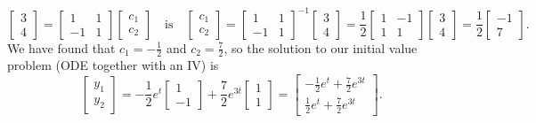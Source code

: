 \begin{example}
$$\begin{bmatrix}3\\4\end{bmatrix} 
=
\begin{bmatrix}1 &1\\-1&1\end{bmatrix}
\begin{bmatrix}c_1\\c_2\end{bmatrix}
 \quad\text{is}\quad 
\begin{bmatrix}c_1\\c_2\end{bmatrix} 
=
\begin{bmatrix}1 &1\\-1&1\end{bmatrix}^{-1}
\begin{bmatrix}3\\4\end{bmatrix} 
=
\frac{1}{2}
\begin{bmatrix}1 &-1\\1&1\end{bmatrix}
\begin{bmatrix}3\\4\end{bmatrix} 
=
\frac{1}{2}
\begin{bmatrix}-1 \\7\end{bmatrix}
.$$ We have found that $c_1=-\frac12$ and $c_2=\frac72$, so the solution to our initial value problem (ODE together with an IV) is 
$$ \begin{bmatrix}y_1\\y_2\end{bmatrix} 
= -\frac12 e^t \begin{bmatrix}1\\-1\end{bmatrix} 
+ \frac72 e^{3t} \begin{bmatrix}1\\1\end{bmatrix}
=
\begin{bmatrix}-\frac12e^t + \frac72e^{3t}\\\frac12e^t + \frac72e^{3t}\end{bmatrix}.$$
\end{example}


